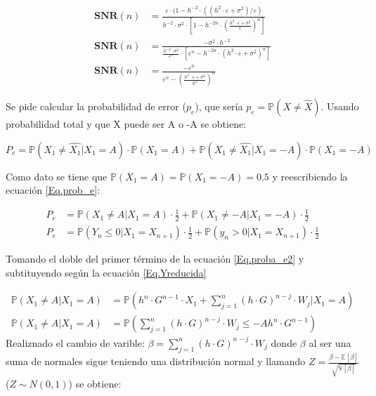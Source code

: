 			\begin{align}
				\textbf{SNR}(n) &= \frac{\varepsilon \cdot (1- h^{-2} \cdot \left( (h^2 \cdot \varepsilon + \sigma ^2 ) / \varepsilon \right) }{h^{-2} \cdot \sigma ^2 \cdot \left[ 1- h^{-2n} \cdot \left( \frac{h^2 \cdot \varepsilon + \sigma ^2}{\varepsilon} \right) ^n \right]} \\
				\textbf{SNR}(n) &= \frac{- \sigma ^2 \cdot h^{-2}}{\frac{h^{-2} \cdot \sigma ^2}{\varepsilon ^n} \cdot [\varepsilon ^n - h^{-2n} \cdot (h^2 \cdot \varepsilon + \sigma ^2)^n]} \\
				\textbf{SNR}(n) &= \frac{- \varepsilon ^n}{\varepsilon ^n - \left( \frac{h^2 \cdot \varepsilon + \sigma ^2}{h^2} \right) ^n}			
			\end{align}
	
\indent Se pide calcular la probabilidad de error ($p_e$), que sería $p_e = \mathbb{P}(X \neq \widehat{X})$. Usando probabilidad total y que X puede ser A o -A se obtiene:

			\begin{equation}
				P_e = \mathbb{P}(X_1 \neq \widehat{X_1} | X_1 = A) \cdot \mathbb{P}(X_1 =A) + \mathbb{P} (X_1 \neq \widehat{X_1} | X_1 = -A) \cdot \mathbb{P}(X_1 = -A)
				\label{Eq.prob_e}
			\end{equation}

\indent	Como dato se tiene que $\mathbb{P}(X_1 = A) = \mathbb{P}(X_1 = -A) = 0.5$ y reescribiendo la ecuación \ref{Eq.prob_e}:

			\begin{align}
				P_e &= \mathbb{P}(X_1 \neq A | X_1 = A) \cdot \frac{1}{2} + \mathbb{P} (X_1 \neq -A | X_1 = -A) \cdot \frac{1}{2} \\
				P_e &= \mathbb{P}(Y_n \leq 0 | X_1 = X_{n+1}) \cdot \frac{1}{2} + \mathbb{P} (y_n > 0 | X_1 = X_{n+1}) \cdot \frac{1}{2} 
				\label{Eq.proba_e2}
			\end{align}

\indent Tomando el doble del primer término de la ecuación \ref{Eq.proba_e2} y subtituyendo según la ecuación \ref{Eq.Yreducida}
			
			\begin{align*}
				\mathbb{P}(X_1 \neq A | X_1 = A) &= \mathbb{P}\left( h^n \cdot G^{n-1} \cdot X_1 + \sum_{j=1}^{n}(h \cdot G)^{n-j} \cdot W_j |X_1=A \right)	\\
				\mathbb{P}(X_1 \neq A | X_1 = A) &= \mathbb{P} \left( \sum_{j=1}^{n} (h \cdot G)^{n-j} \cdot W_j \leq -A h^n \cdot G^{n-1} \right)		
			\end{align*}
\indent Realiznado el cambio de varible: $\beta = \sum_{j=1}^{n} (h \cdot G)^{n-j} \cdot W_j$ donde $\beta$	al ser una suma de normales sigue teniendo una distribución normal y llamando $Z= \frac{\beta - \mathbb{E}[\beta]}{\sqrt{\mathbb{V}[\beta]}}$ ($Z \sim N(0,1)$) se obtiene:

